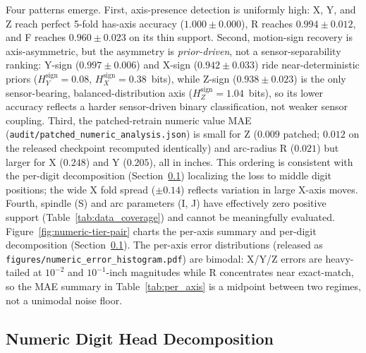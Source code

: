 \documentclass[sensors,article,submit,moreauthors,pdftex]{Definitions/mdpi}
\begin{document}
Four patterns emerge. First, axis-presence detection is uniformly high: X, Y, and Z reach perfect 5-fold has-axis accuracy ($1.000 \pm 0.000$), R reaches $0.994 \pm 0.012$, and F reaches $0.960 \pm 0.023$ on its thin support. Second, motion-sign recovery is axis-asymmetric, but the asymmetry is \emph{prior-driven}, not a sensor-separability ranking: Y-sign ($0.997 \pm 0.006$) and X-sign ($0.942 \pm 0.033$) ride near-deterministic priors ($H_{Y}^{\text{sign}}\!=\!0.08$, $H_{X}^{\text{sign}}\!=\!0.38$~bits), while Z-sign ($0.938 \pm 0.023$) is the only sensor-bearing, balanced-distribution axis ($H_{Z}^{\text{sign}}\!=\!1.04$~bits), so its lower accuracy reflects a harder sensor-driven binary classification, not weaker sensor coupling. Third, the patched-retrain numeric value MAE (\texttt{audit/patched\_numeric\_analysis.json}) is small for Z ($0.009$ patched; $0.012$ on the released checkpoint recomputed identically) and arc-radius R ($0.021$) but larger for X ($0.248$) and Y ($0.205$), all in inches. This ordering is consistent with the per-digit decomposition (Section~\ref{sec:numeric-decomposition}) localizing the loss to middle digit positions; the wide X fold spread ($\pm 0.14$) reflects variation in large X-axis moves. Fourth, spindle (S) and arc parameters (I, J) have effectively zero positive support (Table~\ref{tab:data_coverage}) and cannot be meaningfully evaluated. Figure~\ref{fig:numeric-tier-pair} charts the per-axis summary and per-digit decomposition (Section~\ref{sec:numeric-decomposition}). The per-axis error distributions (released as \texttt{figures/numeric\_error\_histogram.pdf}) are bimodal: X/Y/Z errors are heavy-tailed at $10^{-2}$ and $10^{-1}$-inch magnitudes while R concentrates near exact-match, so the MAE summary in Table~\ref{tab:per_axis} is a midpoint between two regimes, not a unimodal noise floor.

\subsection{Numeric Digit Head Decomposition}
\label{sec:numeric-decomposition}
\end{document}
